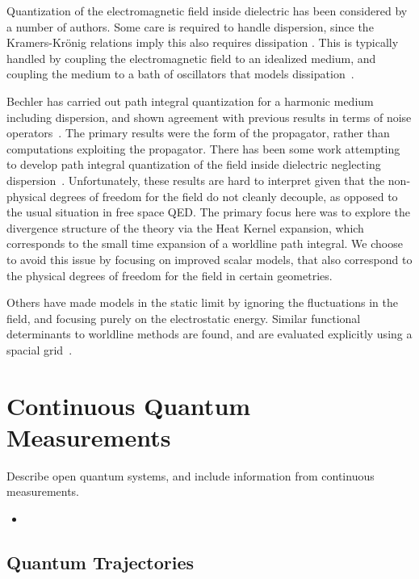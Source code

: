 Quantization of the electromagnetic field inside dielectric has been considered
 by a number of authors.  
Some care is required to handle dispersion, since the Kramers-Kr\"onig relations
 imply this also requires dissipation .  
This is typically handled by coupling the electromagnetic field to an idealized
 medium, and coupling the medium to a bath of oscillators that models
 dissipation~\cite{Huttner1992,Dung1998}.  

Bechler has carried out path integral quantization for a harmonic medium 
including dispersion, and shown agreement with previous results in terms 
of noise operators~\cite{Bechler1999}.  
The primary results were the form of the propagator, 
rather than computations exploiting the propagator.
  There has been some work attempting to develop path integral quantization of
 the field inside dielectric neglecting dispersion~\cite{Bordag1998}.
  Unfortunately, these results are hard to interpret given that the non-physical
 degrees of freedom for the field do not cleanly decouple, as opposed to the 
usual situation in free space QED.
  The primary focus here was to explore the divergence structure of the theory
 via the Heat Kernel expansion, which corresponds to the small time expansion
 of a worldline path integral.
  We choose to avoid this issue by focusing on improved scalar models, 
that also correspond to the physical degrees of freedom for the field in certain geometries.  

Others have made models in the static limit by ignoring the fluctuations in the field,
and focusing purely on the electrostatic energy.
 Similar functional determinants to worldline methods are found,
 and are evaluated explicitly using a spacial grid~\cite{Pasquali2008}.  


\section{Continuous Quantum Measurements}

Describe open quantum systems, and include information from continuous measurements. 
\begin{itemize}
  \item 
\end{itemize}


\subsection{Quantum Trajectories}

